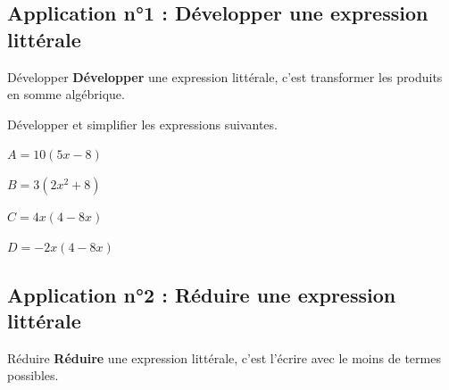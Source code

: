 \documentclass[a4paper]{book}
\begin{document}
\subsection{Application n°1 : Développer une expression littérale}
    \begin{definitionTitre}{Développer}
        \textbf{Développer} une expression littérale, c'est transformer les produits en somme algébrique.
    \end{definitionTitre}
    

    \begin{exemple}
        Développer et simplifier les expressions suivantes.

        \medskip

        \begin{minipage}{0.24\linewidth}
            $A=10(5x-8)$

            \vspace{2cm}
        \end{minipage}
        \hfill\vline\hfill
        \begin{minipage}{0.24\linewidth}
            $B=3(2x^2+8)$

            \vspace{2cm}
        \end{minipage}
        \hfill\vline\hfill
        \begin{minipage}{0.24\linewidth}
            $C=4x(4-8x)$

            \vspace{2cm}
        \end{minipage}
        \hfill\vline\hfill
        \begin{minipage}{0.24\linewidth}
            $D=-2x(4-8x)$

            \vspace{2cm}
        \end{minipage}
    \end{exemple}


\newpage


\subsection{Application n°2 : Réduire une expression littérale}
    \begin{definitionTitre}{Réduire}
        \textbf{Réduire} une expression littérale, c'est l'écrire avec le moins de termes possibles.
    \end{definitionTitre}
\end{document}
